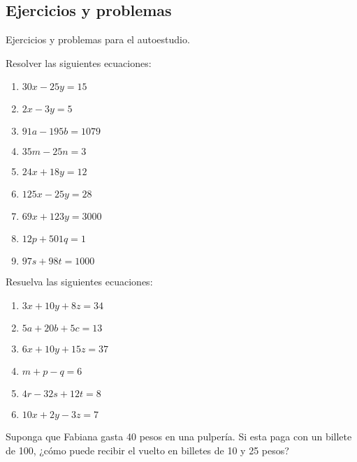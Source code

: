\subsection{Ejercicios y problemas}

Ejercicios y problemas para el autoestudio.

\begin{exercise}
    Resolver las siguientes ecuaciones:
    \begin{multicols}{3}
        \begin{enumerate}
            \item $30x - 25y = 15$
            \item $2x - 3y = 5$
            \item $91a - 195b = 1079$
            \item $35m - 25n = 3$
            \item $24x + 18y = 12$
            \item $125x - 25y = 28$
            \item $69x + 123y = 3000$
            \item $12p + 501q=1$
            \item $97s + 98t=1000$
        \end{enumerate}
    \end{multicols}
\end{exercise}

\begin{exercise}
    Resuelva las siguientes ecuaciones:
    \begin{multicols}{3}
        \begin{enumerate}
            \item $3x+10y+8z=34$
            \item $5a+20b+5c=13$
            \item $6x+10y+15z=37$
            \item $m+p-q=6$
            \item $4r-32s+12t=8$
            \item $10x+2y-3z=7$
        \end{enumerate}
    \end{multicols}
\end{exercise}

\begin{problem}
    Suponga que Fabiana gasta 40 pesos en una pulpería.
    Si esta paga con un billete de 100, ¿cómo puede recibir el vuelto en billetes de 10 y 25 pesos?
\end{problem}

